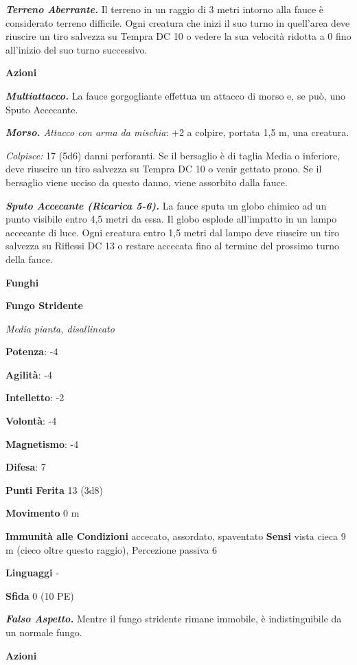 \begin{multicols}{2}
\emph{\textbf{Terreno Aberrante.}} Il terreno in un raggio di 3 metri
intorno alla fauce è considerato terreno difficile. Ogni creatura che
inizi il suo turno in quell'area deve riuscire un tiro salvezza su Tempra
DC 10 o vedere la sua velocità ridotta a 0 fino all'inizio del suo turno
successivo.

\textbf{Azioni}

\emph{\textbf{Multiattacco.}} La fauce gorgogliante effettua un attacco
di morso e, se può, uno Sputo Accecante.

\emph{\textbf{Morso.} Attacco con arma da mischia}: +2 a colpire,
portata 1,5 m, una creatura.

\emph{Colpisce:} 17 (5d6) danni perforanti. Se il bersaglio è di taglia
Media o inferiore, deve riuscire un tiro salvezza su Tempra DC 10 o venir
gettato prono. Se il bersaglio viene ucciso da questo danno, viene
assorbito dalla fauce.

\emph{\textbf{Sputo Accecante (Ricarica 5-6).}} La fauce sputa un globo
chimico ad un punto visibile entro 4,5 metri da essa. Il globo esplode
all'impatto in un lampo accecante di luce. Ogni creatura entro 1,5 metri
dal lampo deve riuscire un tiro salvezza su Riflessi DC 13 o restare
accecata fino al termine del prossimo turno della fauce.



\textbf{Funghi}

\textbf{Fungo Stridente}

\emph{Media pianta, disallineato}

\textbf{Potenza}: -4

\textbf{Agilità}: -4

\textbf{Intelletto}: -2

\textbf{Volontà}: -4

\textbf{Magnetismo}: -4

\textbf{Difesa}: 7

\textbf{Punti Ferita} 13 (3d8)

\textbf{Movimento} 0 m

\textbf{Immunità alle Condizioni} accecato, assordato, spaventato
\textbf{Sensi} vista cieca 9 m (cieco oltre questo raggio), Percezione
passiva 6

\textbf{Linguaggi} -

\textbf{Sfida} 0 (10 PE)

\emph{\textbf{Falso Aspetto.}} Mentre il fungo stridente rimane
immobile, è indistinguibile da un normale fungo.

\textbf{Azioni}


\end{multicols}

